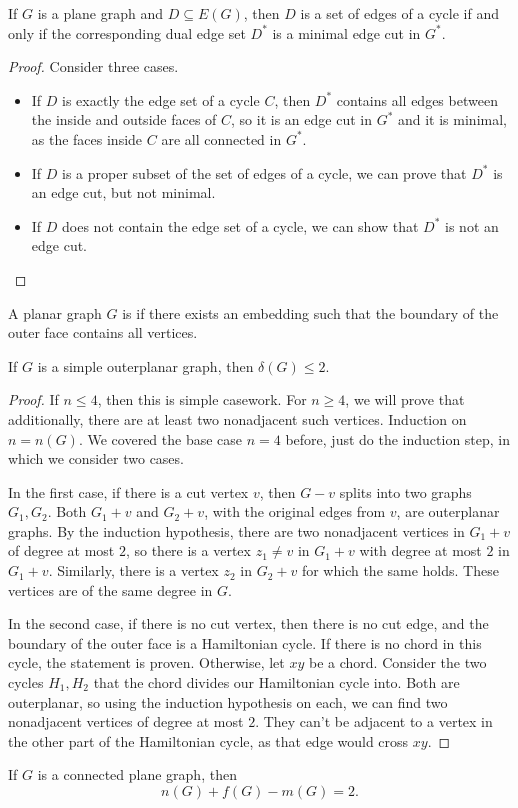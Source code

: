 \begin{theorem}
  If $G$ is a plane graph and $D \subseteq E(G)$, then $D$ is a set of edges of
  a cycle if and only if the corresponding dual edge set $D^*$ is a minimal edge
  cut in $G^*$.
\end{theorem}

\begin{proof}
  Consider three cases.
  \begin{itemize}
  \item If $D$ is exactly the edge set of a cycle $C$, then $D^*$ contains all
	edges between the inside and outside faces of $C$, so it is an edge cut in
	$G^*$ and it is minimal, as the faces inside $C$ are all connected in $G^*$.
  \item If $D$ is a proper subset of the set of edges of a cycle, we can prove
	that $D^*$ is an edge cut, but not minimal.
  \item If $D$ does not contain the edge set of a cycle, we can show that $D^*$
	is not an edge cut. \qedhere
  \end{itemize}
\end{proof}

\begin{definition}
  A planar graph $G$ is  if there exists an embedding such
  that the boundary of the outer face contains all vertices.
\end{definition}

\begin{theorem}
  If $G$ is a simple outerplanar graph, then $\delta(G) \le 2$.
\end{theorem}

\begin{proof}
  If $n \le 4$, then this is simple casework.
  For $n \ge 4$, we will prove that additionally, there are at least two
  nonadjacent such vertices.
  Induction on $n = n(G)$.
  We covered the base case $n=4$ before, just do the induction step, in which we
  consider two cases.

  In the first case, if there is a cut vertex $v$, then $G-v$ splits into two
  graphs $G_1, G_2$.
  Both $G_1 + v$ and $G_2 + v$, with the original edges from $v$, are
  outerplanar graphs.
  By the induction hypothesis, there are two nonadjacent vertices in $G_1 + v$
  of degree at most $2$, so there is a vertex $z_1 \ne v$ in $G_1 + v$ with
  degree at most $2$ in $G_1 + v$.
  Similarly, there is a vertex $z_2$ in $G_2 + v$ for which the same holds.
  These vertices are of the same degree in $G$.

  In the second case, if there is no cut vertex, then there is no cut edge, and
  the boundary of the outer face is a Hamiltonian cycle.
  If there is no chord in this cycle, the statement is proven.
  Otherwise, let $xy$ be a chord.
  Consider the two cycles $H_1, H_2$ that the chord divides our Hamiltonian
  cycle into.
  Both are outerplanar, so using the induction hypothesis on each, we can find
  two nonadjacent vertices of degree at most $2$.
  They can't be adjacent to a vertex in the other part of the Hamiltonian cycle,
  as that edge would cross $xy$.
\end{proof}

\begin{theorem}[Euler]
  If $G$ is a connected plane graph, then
  \[
	n(G) + f(G) - m(G) = 2.
  \]
\end{theorem}

